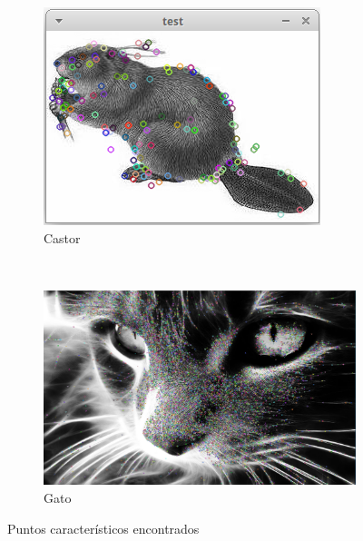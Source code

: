 \begin{figure}[H]
    \centering
    \begin{subfigure}[b]{0.4\textwidth}
        \includegraphics[width=\textwidth]{img/castor.png}
        \caption{Castor}
    \end{subfigure}
    ~ %
      \begin{subfigure}[b]{0.4\textwidth}
        \includegraphics[width=\textwidth]{img/gato.png}
        \caption{Gato}
    \end{subfigure}
    \caption{Puntos característicos encontrados }
\end{figure}



